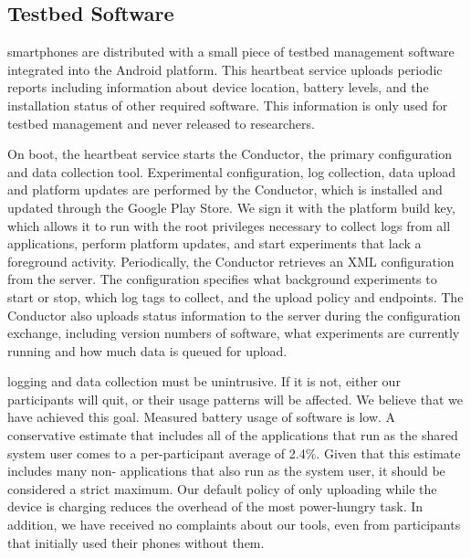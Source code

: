 \subsection{Testbed Software}

\PhoneLab{} smartphones are distributed with a small piece of testbed
management software integrated into the Android platform. This heartbeat
service uploads periodic reports including information about device location,
battery levels, and the installation status of other required \PhoneLab{}
software. This information is only used for testbed management and never
released to researchers.

On boot, the heartbeat service starts the \PhoneLab{} Conductor, the primary
\PhoneLab{} configuration and data collection tool. Experimental
configuration, log collection, data upload and platform updates are performed
by the Conductor, which is installed and updated through the Google Play
Store. We sign it with the platform build key, which allows it to run with
the root privileges necessary to collect logs from all applications, perform
platform updates, and start experiments that lack a foreground activity.
Periodically, the Conductor retrieves an XML configuration from the
\PhoneLab{} server. The configuration specifies what background experiments
to start or stop, which log tags to collect, and the upload policy and
endpoints. The Conductor also uploads status information to the server during
the configuration exchange, including version numbers of \PhoneLab{}
software, what experiments are currently running and how much data is queued
for upload.

\PhoneLab{} logging and data collection must be unintrusive. If it is not,
either our participants will quit, or their usage patterns will be affected.
We believe that we have achieved this goal. Measured battery usage of
\PhoneLab{} software is low. A conservative estimate that includes all of the
applications that run as the shared system user comes to a per-participant
average of 2.4\%. Given that this estimate includes many non-\PhoneLab{}
applications that also run as the system user, it should be considered a
strict maximum. Our default policy of only uploading while the device is
charging reduces the overhead of the most power-hungry task. In addition, we
have received no complaints about our tools, even from participants that
initially used their phones without them.

